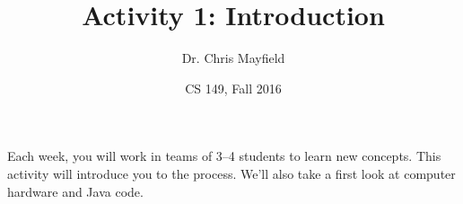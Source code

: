 \documentclass[12pt]{article}
\title{Activity 1: Introduction}
\author{Dr. Chris Mayfield}
\date{CS 149, Fall 2016}
\begin{document}
\maketitle

Each week, you will work in teams of 3--4 students to learn new concepts.
This activity will introduce you to the process.
We'll also take a first look at computer hardware and Java code.






\end{document}
